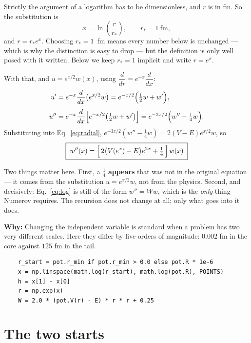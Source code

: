 \documentclass[11pt,a4paper]{article}
\newcommand{\why}[1]{\medskip\noindent\textbf{Why:} #1\medskip}
\begin{document}
Strictly the argument of a logarithm has to be dimensionless, and $r$ is in fm.
So the substitution is
\begin{equation}
  x = \ln\!\left(\frac{r}{r_*}\right), \qquad r_* = 1~\mathrm{fm},
  \label{eq:logsub}
\end{equation}
and $r = r_*e^{x}$. Choosing $r_* = 1$~fm means every number below is unchanged
--- which is why the distinction is easy to drop --- but the definition is only
well posed with it written. Below we keep $r_* = 1$ implicit and write $r = e^x$.

With that, and $u = e^{x/2}w(x)$, using $\dfrac{d}{dr} = e^{-x}\dfrac{d}{dx}$:
\begin{align}
  u' &= e^{-x}\frac{d}{dx}\bigl(e^{x/2}w\bigr)
      = e^{-x/2}\Bigl(\tfrac12 w + w'\Bigr),\\[4pt]
  u'' &= e^{-x}\frac{d}{dx}\Bigl[e^{-x/2}\bigl(\tfrac12 w + w'\bigr)\Bigr]
       = e^{-3x/2}\Bigl(w'' - \tfrac14 w\Bigr).
\end{align}
Substituting into Eq.~\eqref{eq:radial}, $e^{-3x/2}(w''-\tfrac14 w) = 2(V-E)e^{x/2}w$, so
\begin{equation}
  \boxed{\;w''(x) = \Bigl[\,2\bigl(V(e^x)-E\bigr)e^{2x} + \tfrac14\,\Bigr]\,w(x)\;}
  \label{eq:log}
\end{equation}

Two things matter here. First, a $\tfrac14$ \textbf{appears} that was not in the
original equation --- it comes from the substitution $u = e^{x/2}w$, not from
the physics. Second, and decisively: Eq.~\eqref{eq:log} is still of the form
$w'' = W w$, which is the \emph{only} thing Numerov requires. The recursion does
not change at all; only what goes into it does.

\why{Changing the independent variable is standard when a problem has
two very different scales. Here they differ by five orders of magnitude:
$0.002$ fm in the core against $125$ fm in the tail.}

\begin{lstlisting}
    r_start = pot.r_min if pot.r_min > 0.0 else pot.R * 1e-6
    x = np.linspace(math.log(r_start), math.log(pot.R), POINTS)
    h = x[1] - x[0]
    r = np.exp(x)
    W = 2.0 * (pot.V(r) - E) * r * r + 0.25
\end{lstlisting}

\section{The two starts}
\label{sec:starts}
\end{document}
